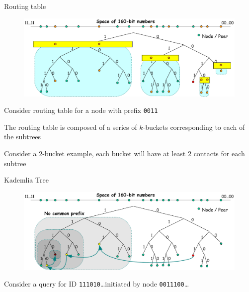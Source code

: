 \begin{frame}[t]{Routing table}

\begin{figure}
	\includegraphics[width=\textwidth]{figs/10/kad4}
\end{figure}

\BI
\item Consider routing table for a node with prefix \texttt{0011}
\item The routing table is composed of a series of \alert{$k$-buckets} corresponding to each of the subtrees
\item Consider a $2$-bucket example, each bucket will have at least $2$ contacts for each subtree
\EI

\end{frame}

\begin{frame}[t]{Kademlia Tree}

\begin{figure}
	\includegraphics[width=\textwidth]{figs/10/kad3}
\end{figure}

\BI
\item Consider a query for ID \texttt{\alert{1110}10}\ldots initiated by node \texttt{\alert{0011}100}\ldots
\EI

\end{frame}

